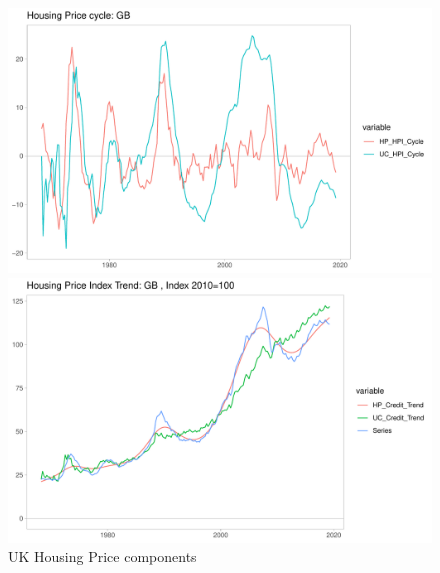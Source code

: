 \documentclass[fleqn]{article}
\begin{document}
\begin{outline}[enumerate]
\begin{figure}[h!]
	\caption{UK Housing Price components}	
	\centerline{\includegraphics[scale=0.7]{../Output/Graphs/HP_cycle_GB.pdf}}
	\centerline{\includegraphics[scale=0.7]{../Output/Graphs/HP_trend_GB.pdf}}
\end{figure}



\end{outline}
\end{document}
